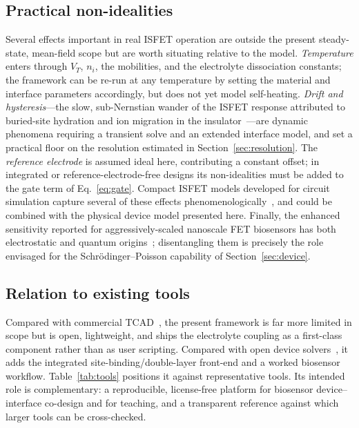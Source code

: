 \documentclass[10pt,journal]{IEEEtran}
\begin{document}
\subsection{Practical non-idealities}
Several effects important in real ISFET operation are outside the present
steady-state, mean-field scope but are worth situating relative to the model.
\emph{Temperature} enters through $V_T$, $n_i$, the mobilities, and the
electrolyte dissociation constants; the framework can be re-run at any temperature
by setting the material and interface parameters accordingly, but does not yet
model self-heating. \emph{Drift and hysteresis}---the slow, sub-Nernstian
wander of the ISFET response attributed to buried-site hydration and ion
migration in the insulator~\cite{jamasb1998}---are dynamic phenomena requiring a
transient solve and an extended interface model, and set a practical floor on the
resolution estimated in Section~\ref{sec:resolution}. The \emph{reference
electrode} is assumed ideal here, contributing a constant offset; in integrated
or reference-electrode-free designs its non-idealities must be added to the gate
term of Eq.~\eqref{eq:gate}. Compact ISFET models developed for circuit
simulation capture several of these effects
phenomenologically~\cite{martinoia2005,chin2001}, and could be combined with the
physical device model presented here. Finally, the enhanced sensitivity reported
for aggressively-scaled nanoscale FET biosensors has both electrostatic and
quantum origins~\cite{shoorideh2014,nair2007}; disentangling them is precisely
the role envisaged for the Schr\"odinger--Poisson capability of
Section~\ref{sec:device}.

\subsection{Relation to existing tools}
Compared with commercial TCAD~\cite{sentaurus,comsol}, the present framework is
far more limited in scope but is open, lightweight, and ships the electrolyte
coupling as a first-class component rather than as user scripting. Compared with
open device solvers~\cite{sanchez2016,charon2020}, it adds the integrated
site-binding/double-layer front-end and a worked biosensor workflow.
Table~\ref{tab:tools} positions it against representative tools. Its intended
role is complementary: a reproducible, license-free platform for biosensor
device--interface co-design and for teaching, and a transparent reference against
which larger tools can be cross-checked.
\end{document}
